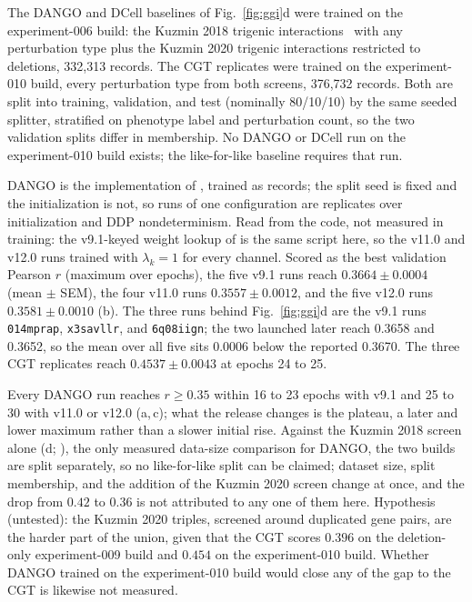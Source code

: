  The DANGO and DCell baselines of Fig.~\ref{fig:ggi}d were trained on
the experiment-006 build: the Kuzmin 2018 trigenic
interactions~\cite{kuzminSystematicAnalysisComplex2018a} with any perturbation type plus the
Kuzmin 2020 trigenic interactions restricted to deletions, 332,313 records. The CGT
replicates were trained on the experiment-010 build, every perturbation type from both
screens, 376,732 records. Both are split into training, validation, and test (nominally
80/10/10) by the same seeded splitter, stratified on phenotype label and perturbation count,
so the two validation splits differ in membership. No DANGO or DCell run on the
experiment-010 build exists; the like-for-like baseline requires that run.

 DANGO is the implementation of ,
trained as  records; the split seed is fixed and the
initialization is not, so runs of one configuration are replicates over initialization and
DDP nondeterminism. Read from the code, not measured in training: the v9.1-keyed weight
lookup of  is the same script here, so the v11.0 and v12.0 runs
trained with $\lambda_k=1$ for every channel. Scored as the best validation Pearson $r$
(maximum over epochs), the five v9.1 runs reach $0.3664 \pm 0.0004$ (mean $\pm$ SEM), the
four v11.0 runs $0.3557 \pm 0.0012$, and the five v12.0 runs $0.3581 \pm 0.0010$
(b). The three runs behind Fig.~\ref{fig:ggi}d are the v9.1 runs
\texttt{014mprap}, \texttt{x3savllr}, and \texttt{6q08iign}; the two launched later reach
0.3658 and 0.3652, so the mean over all five sits 0.0006 below the reported 0.3670. The
three CGT replicates reach $0.4537 \pm 0.0043$ at epochs 24 to 25.

 Every DANGO run reaches $r \ge 0.35$ within 16 to 23
epochs with v9.1 and 25 to 30 with v11.0 or v12.0 (a,\,c); what the
release changes is the plateau, a later and lower maximum rather than a slower initial rise.
Against the Kuzmin 2018 screen alone (d;
), the only measured data-size comparison for DANGO, the
two builds are split separately, so no like-for-like split can be claimed; dataset size,
split membership, and the addition of the Kuzmin 2020 screen change at once, and the drop
from $0.42$ to $0.36$ is not attributed to any one of them here. Hypothesis (untested): the
Kuzmin 2020 triples, screened around duplicated gene pairs, are the harder part of the
union, given that the CGT scores $0.396$ on the deletion-only experiment-009 build and
$0.454$ on the experiment-010 build. Whether DANGO trained on the experiment-010 build would
close any of the gap to the CGT is likewise not measured.

